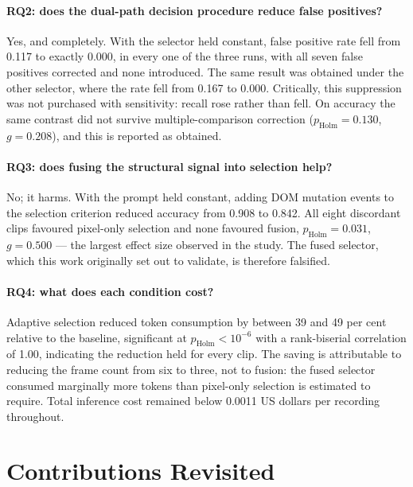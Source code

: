 \paragraph{RQ2: does the dual-path decision procedure reduce false
positives?}
Yes, and completely. With the selector held constant, false positive rate
fell from 0.117 to exactly 0.000, in every one of the three runs, with all
seven false positives corrected and none introduced. The same result was
obtained under the other selector, where the rate fell from 0.167 to
0.000. Critically, this suppression was not purchased with sensitivity:
recall rose rather than fell. On accuracy the same contrast did not
survive multiple-comparison correction ($p_{\text{Holm}} = 0.130$,
$g = 0.208$), and this is reported as obtained.

\paragraph{RQ3: does fusing the structural signal into selection help?}
No; it harms. With the prompt held constant, adding DOM mutation events to
the selection criterion reduced accuracy from 0.908 to 0.842. All eight
discordant clips favoured pixel-only selection and none favoured fusion,
$p_{\text{Holm}} = 0.031$, $g = 0.500$ --- the largest effect size
observed in the study. The fused selector, which this work originally set
out to validate, is therefore falsified.

\paragraph{RQ4: what does each condition cost?}
Adaptive selection reduced token consumption by between 39 and 49 per cent
relative to the baseline, significant at $p_{\text{Holm}} < 10^{-6}$ with
a rank-biserial correlation of 1.00, indicating the reduction held for
every clip. The saving is attributable to reducing the frame count from
six to three, not to fusion: the fused selector consumed marginally more
tokens than pixel-only selection is estimated to require. Total inference
cost remained below \num{0.0011} US dollars per recording throughout.


\section{Contributions Revisited}
\label{sec:contributions-revisited}

